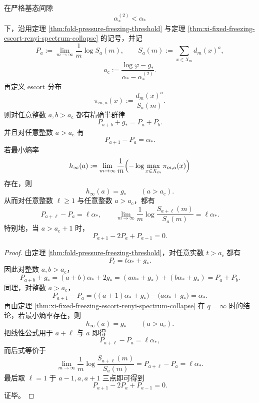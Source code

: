\begin{theorem}[冻结相后的矩谱半群线性化与最小熵钉扎]\label{thm:conclusion-frozen-moment-spectrum-semigroup-linearization}
在严格基态间隙
\[
\alpha_*^{(2)}<\alpha_*
\]
下，沿用定理 \ref{thm:fold-pressure-freezing-threshold} 与定理 \ref{thm:xi-fixed-freezing-escort-renyi-spectrum-collapse} 的记号，并记
\[
P_a:=\lim_{m\to\infty}\frac1m\log S_a(m),
\qquad
S_a(m):=\sum_{x\in X_m}d_m(x)^a,
\]
\[
a_{\mathrm c}:=\frac{\log\varphi-g_*}{\alpha_*-\alpha_*^{(2)}}.
\]
再定义 escort 分布
\[
\pi_{m,a}(x):=\frac{d_m(x)^a}{S_a(m)}.
\]
则对任意整数 \(a,b>a_{\mathrm c}\) 都有精确半群律
\[
\boxed{\;
P_{a+b}+g_*=P_a+P_b.\;}
\]
并且对任意整数 \(a>a_{\mathrm c}\) 有
\[
\boxed{\;
P_{a+1}-P_a=\alpha_*.\;}
\]
若最小熵率
\[
h_\infty(a):=\lim_{m\to\infty}\frac1m\Bigl(-\log\max_{x\in X_m}\pi_{m,a}(x)\Bigr)
\]
存在，则
\[
\boxed{\;
h_\infty(a)=g_*
\qquad (a>a_{\mathrm c}).\;}
\]
从而对任意整数 \(\ell\ge 1\) 与任意整数 \(a>a_{\mathrm c}\)，都有
\[
\boxed{\;
P_{a+\ell}-P_a=\ell\alpha_*,
\qquad
\lim_{m\to\infty}\frac1m\log\frac{S_{a+\ell}(m)}{S_a(m)}=\ell\alpha_*.\;}
\]
特别地，当 \(a>a_{\mathrm c}+1\) 时，
\[
P_{a+1}-2P_a+P_{a-1}=0.
\]
\end{theorem}
\begin{proof}
由定理 \ref{thm:fold-pressure-freezing-threshold}，对任意实数 \(t>a_{\mathrm c}\) 都有
\[
P_t=t\alpha_*+g_*.
\]
因此对整数 \(a,b>a_{\mathrm c}\)，
\[
P_{a+b}+g_*
=
(a+b)\alpha_*+2g_*
=
(a\alpha_*+g_*)+(b\alpha_*+g_*)
=
P_a+P_b.
\]
同理，对整数 \(a>a_{\mathrm c}\)，
\[
P_{a+1}-P_a
=
\bigl((a+1)\alpha_*+g_*\bigr)-\bigl(a\alpha_*+g_*\bigr)
=
\alpha_*.
\]
再由定理 \ref{thm:xi-fixed-freezing-escort-renyi-spectrum-collapse} 在 \(q=\infty\) 时的结论，若最小熵率存在，则
\[
h_\infty(a)=g_*
\qquad (a>a_{\mathrm c}).
\]
把线性公式用于 \(a+\ell\) 与 \(a\) 即得
\[
P_{a+\ell}-P_a=\ell\alpha_*,
\]
而后式等价于
\[
\lim_{m\to\infty}\frac1m\log\frac{S_{a+\ell}(m)}{S_a(m)}
=
P_{a+\ell}-P_a
=
\ell\alpha_*.
\]
最后取 \(\ell=1\) 于 \(a-1,a,a+1\) 三点即可得到
\[
P_{a+1}-2P_a+P_{a-1}=0.
\]
证毕。
\end{proof}

